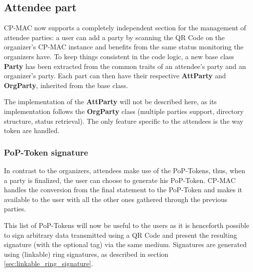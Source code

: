 \subsection{Attendee part}
CP-MAC now supports a completely independent section for the management of attendee parties: a user can add a party by scanning the QR Code on the organizer's CP-MAC instance and benefits from the same status monitoring the organizers have. To keep things consistent in the code logic, a new base class \textbf{Party} has been extracted from the common traits of an attendee's party and an organizer's party. Each part can then have their respective \textbf{AttParty} and \textbf{OrgParty}, inherited from the base class.

The implementation of the \textbf{AttParty} will not be described here, as its implementation follows the \textbf{OrgParty} class (multiple parties support, directory structure, status retrieval). The only feature specific to the attendees is the way token are handled.
\subsubsection*{PoP-Token signature}
In contrast to the organizers, attendees make use of the PoP-Tokens, thus, when a party is finalized, the user can choose to generate his PoP-Token. CP-MAC handles the conversion from the final statement to the PoP-Token and makes it available to the user with all the other ones gathered through the previous parties. 

This list of PoP-Tokens will now be useful to the users as it is henceforth possible to sign arbitrary data transmitted using a QR Code and present the resulting signature (with the optional tag) via the same medium. Signatures are generated using (linkable) ring signatures, as described in section \ref{sec:linkable_ring_signature}.
